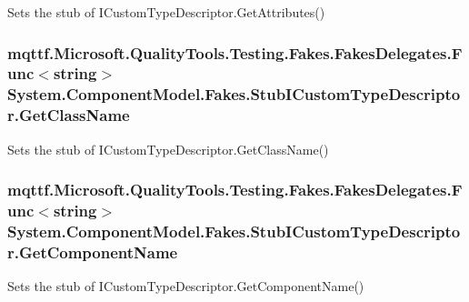 Sets the stub of I\-Custom\-Type\-Descriptor.\-Get\-Attributes()

\hypertarget{class_system_1_1_component_model_1_1_fakes_1_1_stub_i_custom_type_descriptor_a2db03967132aaafb053e5dd78e30254c}{
\subsubsection[{Get\-Class\-Name}]{\setlength{\rightskip}{0pt plus 5cm}mqttf.\-Microsoft.\-Quality\-Tools.\-Testing.\-Fakes.\-Fakes\-Delegates.\-Func$<$string$>$ System.\-Component\-Model.\-Fakes.\-Stub\-I\-Custom\-Type\-Descriptor.\-Get\-Class\-Name}}\label{class_system_1_1_component_model_1_1_fakes_1_1_stub_i_custom_type_descriptor_a2db03967132aaafb053e5dd78e30254c}


Sets the stub of I\-Custom\-Type\-Descriptor.\-Get\-Class\-Name()

\hypertarget{class_system_1_1_component_model_1_1_fakes_1_1_stub_i_custom_type_descriptor_ae60e6f0f392c73fd4debdfab4835c062}{
\subsubsection[{Get\-Component\-Name}]{\setlength{\rightskip}{0pt plus 5cm}mqttf.\-Microsoft.\-Quality\-Tools.\-Testing.\-Fakes.\-Fakes\-Delegates.\-Func$<$string$>$ System.\-Component\-Model.\-Fakes.\-Stub\-I\-Custom\-Type\-Descriptor.\-Get\-Component\-Name}}\label{class_system_1_1_component_model_1_1_fakes_1_1_stub_i_custom_type_descriptor_ae60e6f0f392c73fd4debdfab4835c062}


Sets the stub of I\-Custom\-Type\-Descriptor.\-Get\-Component\-Name()

